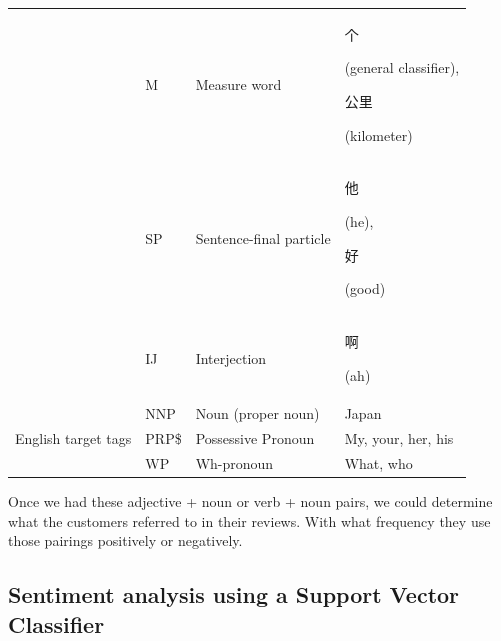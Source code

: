 \documentclass[smallextended,natbib]{svjour3}       %
\begin{document}
\begin{table}[ht]
{\begin{tabular}{|c|l|l|l|}
         &
          M &
          Measure word &
          \begin{CJK}{UTF8}{gbsn}个\end{CJK} (general classifier), \begin{CJK}{UTF8}{gbsn}公里\end{CJK} (kilometer) \\ \cline{2-4} 
         &
          SP &
          Sentence-final particle &
          \begin{CJK}{UTF8}{gbsn}他\end{CJK} (he), \begin{CJK}{UTF8}{gbsn}好\end{CJK} (good) \\ \cline{2-4} 
                                                & IJ    & Interjection       & \begin{CJK}{UTF8}{gbsn}啊\end{CJK} (ah)     \\ \hline
        \multirow{3}{*}{English target tags}    & NNP   & Noun (proper noun) & Japan                                      \\ \cline{2-4} 
                                                & PRP\$ & Possessive Pronoun & My, your, her, his                         \\ \cline{2-4} 
                                                & WP    & Wh-pronoun         & What, who                                  \\ \hline
        \end{tabular}%
        }
    \end{table}

    Once we had these adjective + noun or verb + noun pairs, we could determine what the customers referred to in their reviews. With what frequency they use those pairings positively or negatively.

  \subsection{Sentiment analysis using a Support Vector Classifier}\label{sentimentanalysis}
\end{document}
